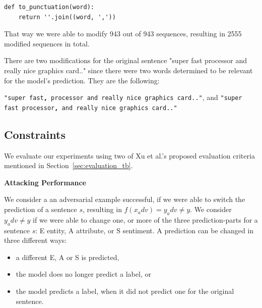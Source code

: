 \begin{lstlisting}
def to_punctuation(word):
    return ''.join((word, ','))
\end{lstlisting}

That way we were able to modify 943 out of 943 sequences, resulting in 2555 modified sequences in total. 

There are two modifications for the original sentence "super fast processor and really nice graphics card.." since there were two words determined to be relevant for the model's prediction. They are the following:

\texttt{"super fast\textbf{,} processor and really nice graphics card.."}, and
\texttt{"super fast processor\textbf{,} and really nice graphics card.."}

\subsection{Constraints}
    \label{sec:constraints_m}

We evaluate our experiments using two of Xu et al.'s proposed evaluation criteria mentioned in Section~\ref{sec:evaluation_tb}. 

\textbf{Attacking Performance}

We consider a an adversarial example successful, if we were able to switch the prediction of a sentence $s$, resulting in ${f(x_adv ) = y_adv \neq y}$.
We consider ${y_adv \neq y}$ if we were able to change one, or more of the three prediction-parts for a sentence $s$: E entity, A attribute, or S sentiment. 
A prediction can be changed in three different ways:
\begin{itemize}
\item a different E, A or S is predicted,
\item the model does no longer predict a label, or
\item the model predicts a label, when it did not predict one for the original sentence.
\end{itemize}

